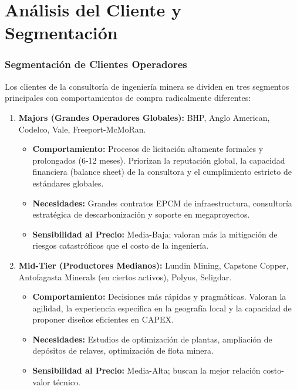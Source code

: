 \chapter{Análisis del Cliente y Segmentación}

\subsection{Segmentación de Clientes Operadores}
Los clientes de la consultoría de ingeniería minera se dividen en tres segmentos principales con comportamientos de compra radicalmente diferentes:

\begin{enumerate}
    \item \textbf{Majors (Grandes Operadores Globales):} BHP, Anglo American, Codelco, Vale, Freeport-McMoRan.
    \begin{itemize}
        \item \textbf{Comportamiento:} Procesos de licitación altamente formales y prolongados (6-12 meses). Priorizan la reputación global, la capacidad financiera (balance sheet) de la consultora y el cumplimiento estricto de estándares globales.
        \item \textbf{Necesidades:} Grandes contratos EPCM de infraestructura, consultoría estratégica de descarbonización y soporte en megaproyectos.
        \item \textbf{Sensibilidad al Precio:} Media-Baja; valoran más la mitigación de riesgos catastróficos que el costo de la ingeniería.
    \end{itemize}

    \item \textbf{Mid-Tier (Productores Medianos):} Lundin Mining, Capstone Copper, Antofagasta Minerals (en ciertos activos), Polyus, Seligdar.
    \begin{itemize}
        \item \textbf{Comportamiento:} Decisiones más rápidas y pragmáticas. Valoran la agilidad, la experiencia específica en la geografía local y la capacidad de proponer diseños eficientes en CAPEX.
        \item \textbf{Necesidades:} Estudios de optimización de plantas, ampliación de depósitos de relaves, optimización de flota minera.
        \item \textbf{Sensibilidad al Precio:} Media-Alta; buscan la mejor relación costo-valor técnico.
    \end{itemize}


\end{enumerate}
